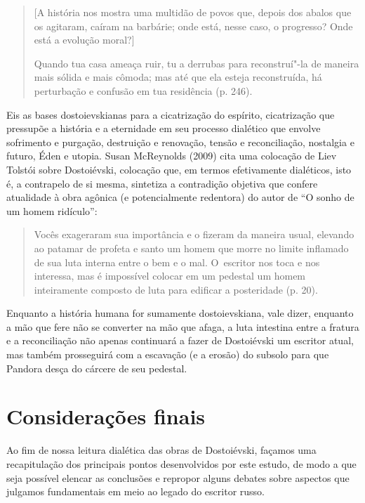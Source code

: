 \begin{quote}
{[}A história nos mostra uma multidão de povos que, depois dos abalos
que os agitaram, caíram na barbárie; onde está, nesse caso, o progresso?
Onde está a evolução moral?{]}

\noindent Quando tua casa ameaça ruir, tu a derrubas para reconstruí"-la de maneira
mais sólida e mais cômoda; mas até que ela esteja reconstruída, há
perturbação e confusão em tua residência (p. 246).
\end{quote}

Eis as bases dostoievskianas para a cicatrização do espírito,
cicatrização que pressupõe a história e a eternidade em seu processo
dialético que envolve sofrimento e purgação, destruição e renovação,
tensão e reconciliação, nostalgia e futuro, Éden e utopia. Susan
McReynolds (2009) cita uma colocação de Liev Tolstói sobre Dostoiévski,
colocação que, em termos efetivamente dialéticos, isto é, a contrapelo
de si mesma, sintetiza a contradição objetiva que confere atualidade à
obra agônica (e potencialmente redentora) do autor de ``O sonho de um
homem ridículo'':

\begin{quote}
Vocês exageraram sua importância e o fizeram da maneira usual, elevando
ao patamar de profeta e santo um homem que morre no limite inflamado de
sua luta interna entre o bem e o mal. O~escritor nos toca e nos
interessa, mas é impossível colocar em um pedestal um homem inteiramente
composto de luta para edificar a posteridade (p. 20).
\end{quote}

Enquanto a história humana for sumamente dostoievskiana, vale dizer,
enquanto a mão que fere não se converter na mão que afaga, a luta
intestina entre a fratura e a reconciliação não apenas continuará a
fazer de Dostoiévski um escritor atual, mas também prosseguirá com a
escavação (e a erosão) do subsolo para que Pandora desça do cárcere de
seu pedestal.

\chapter*{Considerações finais}



Ao fim de nossa leitura dialética das obras de Dostoiévski, façamos uma
recapitulação dos principais pontos desenvolvidos por este estudo, de
modo a que seja possível elencar as conclusões e repropor alguns debates
sobre aspectos que julgamos fundamentais em meio ao legado do escritor
russo.

